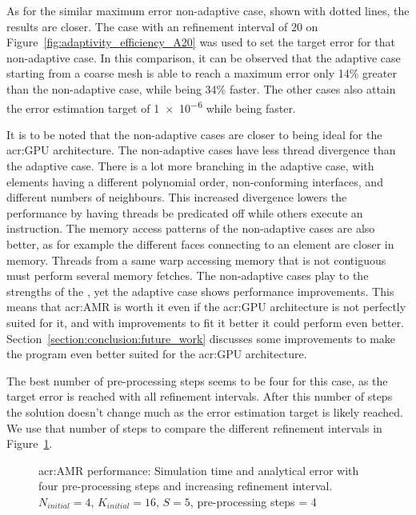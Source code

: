 As for the similar maximum error non-adaptive case, shown with dotted lines, the results are closer.
The case with an refinement interval of 20 on Figure~\ref{fig:adaptivity_efficiency_A20} was used to
set the target error for that non-adaptive case. In this comparison, it can be observed that the
adaptive case starting from a coarse mesh is able to reach a maximum error only 14\% greater than
the non-adaptive case, while being 34\% faster. The other cases also attain the error estimation
target of \num{1e-6} while being faster.

It is to be noted that the non-adaptive cases are closer to being ideal for the \acrshort{acr:GPU}
architecture. The non-adaptive cases have less thread divergence than the adaptive case. There is a
lot more branching in the adaptive case, with elements having a different polynomial order,
non-conforming interfaces, and different numbers of neighbours. This increased divergence lowers the
performance by having threads be predicated off while others execute an instruction. The memory
access patterns of the non-adaptive cases are also better, as for example the different faces
connecting to an element are closer in memory. Threads from a same warp accessing memory that is not
contiguous must perform several memory fetches. The non-adaptive cases play to the strengths of the
, yet the adaptive case shows performance improvements. This means that
\acrshort{acr:AMR} is worth it even if the \acrshort{acr:GPU} architecture is not perfectly suited
for it, and with improvements to fit it better it could perform even better.
Section~\ref{section:conclusion:future_work} discusses some improvements to make the program even
better suited for the \acrshort{acr:GPU} architecture.

The best number of pre-processing steps seems to be four for this case, as the target error is
reached with all refinement intervals. After this number of steps the solution doesn't change much
as the error estimation target is likely reached. We use that number of steps to compare the
different refinement intervals in Figure~\ref{fig:adaptivity_efficiency_C4}.

\begin{figure}[H]
	\centering
	\hfill
	\caption{\Acrlong{acr:AMR} performance: Simulation time and analytical error with four pre-processing steps and increasing refinement interval. \(N_{initial} = 4\), \(K_{initial} = 16\), \(S = 5\), pre-processing steps = 4}\label{fig:adaptivity_efficiency_C4}
\end{figure}

